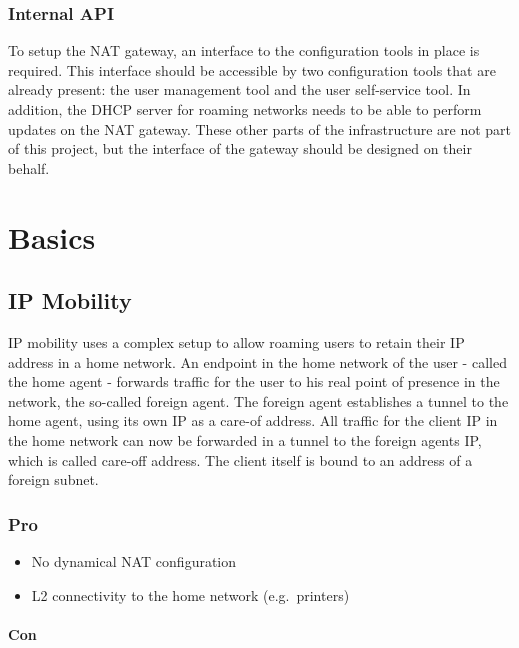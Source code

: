 \documentclass{report}
\begin{document}
\subsection{Internal API}\label{internal-api}

To setup the NAT gateway, an interface to the configuration tools in
place is required. This interface should be accessible by two
configuration tools that are already present: the user management tool
and the user self-service tool. In addition, the DHCP server for roaming
networks needs to be able to perform updates on the NAT gateway. These
other parts of the infrastructure are not part of this project, but the
interface of the gateway should be designed on their behalf.

\chapter{Basics}\label{basics}

\section{IP Mobility}\label{ip-mobility}

IP mobility\cite{IPMob}\cite{MobileIP-cisco} uses a complex setup to allow roaming users to retain their
IP address in a home network. An endpoint in the home network of the
user - called the home agent - forwards traffic for the user to his real
point of presence in the network, the so-called foreign agent. The
foreign agent establishes a tunnel to the home agent, using its own IP
as a care-of address. All traffic for the client IP in the home network
can now be forwarded in a tunnel to the foreign agents IP, which is
called care-off address. The client itself is bound to an address of a
foreign subnet.

\subsection{Pro}\label{pro}

\begin{itemize}
\itemsep1pt\parskip0pt
\item
  No dynamical NAT configuration
\item
  L2 connectivity to the home network (e.g.~printers)
\end{itemize}

\subsubsection{Con}\label{con}
\end{document}
